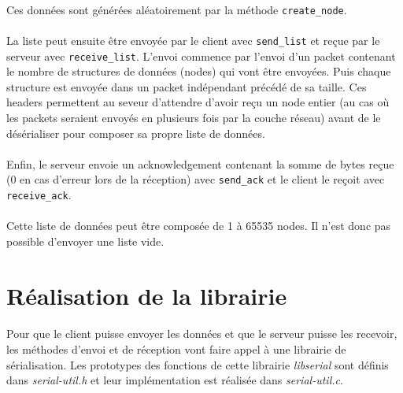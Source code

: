 \documentclass{article}
\begin{document}
    \newpage
    \paragraph{}
    Ces données sont générées aléatoirement par la méthode \texttt{create\_node}.
    
    \paragraph{}
    La liste peut ensuite être envoyée par le client avec \texttt{send\_list} et reçue par le serveur avec \texttt{receive\_list}. L'envoi commence par l'envoi d'un packet contenant le nombre de structures de données (nodes) qui vont être envoyées. Puis chaque structure est envoyée dans un packet indépendant précédé de sa taille. Ces headers permettent au seveur d'attendre d'avoir reçu un node entier (au cas où les packets seraient envoyés en plusieurs fois par la couche réseau) avant de le désérialiser pour composer sa propre liste de données.

    \paragraph{}
    Enfin, le serveur envoie un acknowledgement contenant la somme de bytes reçue (0 en cas d'erreur lors de la réception) avec \texttt{send\_ack} et le client le reçoit avec \texttt{receive\_ack}.

    \paragraph{}
    Cette liste de données peut être composée de 1 à 65535 nodes. Il n'est donc pas possible d'envoyer une liste vide.


    \section{Réalisation de la librairie}
    \paragraph{}
    Pour que le client puisse envoyer les données et que le serveur puisse les recevoir, les méthodes d'envoi et de réception vont faire appel à une librairie de sérialisation. Les prototypes des fonctions de cette librairie \emph{libserial} sont définis dans \emph{serial-util.h} et leur implémentation est réalisée dans \emph{serial-util.c}.
\end{document}
